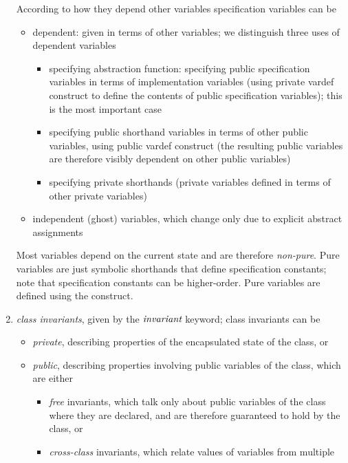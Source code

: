 \begin{enumerate}
      According to how they depend other variables specification variables can be
      \begin{itemize}
      \item dependent: given in terms of other variables; we distinguish three uses of dependent
            variables
            \begin{itemize}
            \item specifying abstraction function: specifying public specification variables
                  in terms of implementation variables (using private vardef construct
	          to define the contents of public specification variables); this is the
                  most important case
            \item specifying public shorthand variables in terms of other public variables,
                  using public vardef construct (the resulting public variables are therefore
                  visibly dependent on other public variables)
            \item specifying private shorthands (private variables defined in terms of
                  other private variables)
	    \end{itemize}
      \item independent (ghost) variables, which change only due to explicit abstract
            assignments
      \end{itemize}
      Most variables depend on the current state and are therefore \emph{non-pure}.
      Pure variables are just symbolic shorthands that define specification constants;
      note that specification constants can be higher-order.  Pure variables are defined
      using the  construct.
\item \emph{class invariants}, given by the $\textit{invariant}$ keyword; class invariants
      can be 
      \begin{itemize}
      \item \emph{private}, describing properties of the encapsulated state of the class,
      or 
      \item \emph{public}, describing properties involving public variables of
      the class, which are either
          \begin{itemize}
          \item \emph{free} invariants, which talk only about public variables of the class 
            where they are declared, and are therefore guaranteed to hold by the class, or
          \item \emph{cross-class} invariants, which relate values of variables from multiple

\end{itemize}
\end{itemize}
\end{enumerate}
